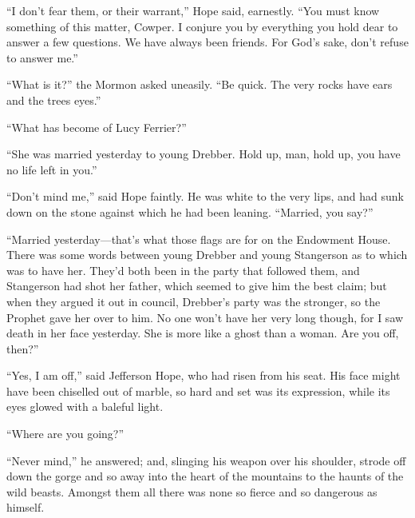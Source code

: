 \documentclass[12pt]{book}
\begin{document}
“I don’t fear them, or their warrant,” Hope said, earnestly. “You must know something of this matter, Cowper. I conjure you by everything you hold dear to answer a few questions. We have always been friends. For God’s sake, don’t refuse to answer me.” 

“What is it?” the Mormon asked uneasily. “Be quick. The very rocks have ears and the trees eyes.” 

“What has become of Lucy Ferrier?” 

“She was married yesterday to young Drebber. Hold up, man, hold up, you have no life left in you.” 

“Don’t mind me,” said Hope faintly. He was white to the very lips, and had sunk down on the stone against which he had been leaning. “Married, you say?” 

“Married yesterday—that’s what those flags are for on the Endowment House. There was some words between young Drebber and young Stangerson as to which was to have her. They’d both been in the party that followed them, and Stangerson had shot her father, which seemed to give him the best claim; but when they argued it out in council, Drebber’s party was the stronger, so the Prophet gave her over to him. No one won’t have her very long though, for I saw death in her face yesterday. She is more like a ghost than a woman. Are you off, then?” 

“Yes, I am off,” said Jefferson Hope, who had risen from his seat. His face might have been chiselled out of marble, so hard and set was its expression, while its eyes glowed with a baleful light. 

“Where are you going?” 

“Never mind,” he answered; and, slinging his weapon over his shoulder, strode off down the gorge and so away into the heart of the mountains to the haunts of the wild beasts. Amongst them all there was none so fierce and so dangerous as himself. 
\end{document}
